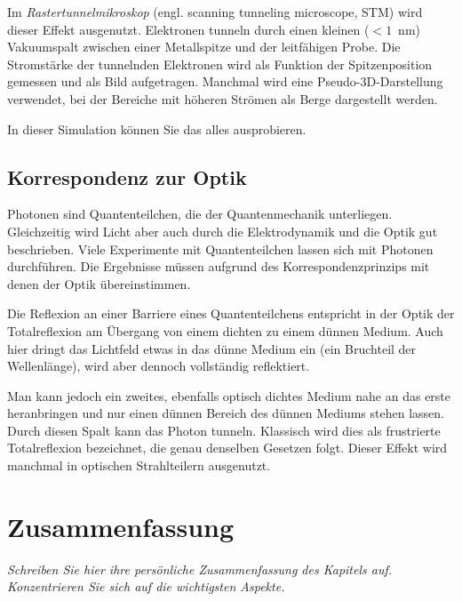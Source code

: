 Im \emph{Rastertunnelmikroskop} (engl. scanning tunneling microscope, STM) wird dieser Effekt ausgenutzt. Elektronen tunneln durch einen kleinen ($< 1$~nm) Vakuumspalt zwischen einer Metallspitze und der leitfähigen Probe. Die Stromstärke der tunnelnden Elektronen wird als Funktion der Spitzenposition gemessen und als Bild aufgetragen. Manchmal wird eine Pseudo-3D-Darstellung verwendet, bei der Bereiche mit höheren Strömen als Berge dargestellt werden.



\begin{questions}
    \item In dieser Simulation können Sie das alles ausprobieren. 
\end{questions}

\subsection{Korrespondenz zur Optik}

Photonen sind Quantenteilchen, die der Quantenmechanik unterliegen. Gleichzeitig wird Licht aber auch durch die Elektrodynamik und die Optik gut beschrieben. Viele Experimente mit Quantenteilchen lassen sich mit Photonen durchführen. Die Ergebnisse müssen aufgrund des Korrespondenzprinzips mit denen der Optik übereinstimmen.

Die Reflexion an einer Barriere eines Quantenteilchens entspricht in der Optik der Totalreflexion am Übergang von einem dichten zu einem dünnen Medium. Auch hier dringt das Lichtfeld etwas in das dünne Medium ein (ein Bruchteil der Wellenlänge), wird aber dennoch vollständig reflektiert.

Man kann jedoch ein zweites, ebenfalls optisch dichtes Medium nahe an das erste heranbringen und nur einen dünnen Bereich des dünnen Mediums stehen lassen. Durch diesen Spalt kann das Photon tunneln. Klassisch wird dies als frustrierte Totalreflexion bezeichnet, die genau denselben Gesetzen folgt. Dieser Effekt wird manchmal in optischen Strahlteilern ausgenutzt.





\section{Zusammenfassung}

\textit{Schreiben Sie hier ihre persönliche Zusammenfassung des Kapitels auf. Konzentrieren Sie sich auf die wichtigsten Aspekte.}

\vspace*{10cm}



\printbibliography[segment=\therefsegment,heading=subbibliography]

